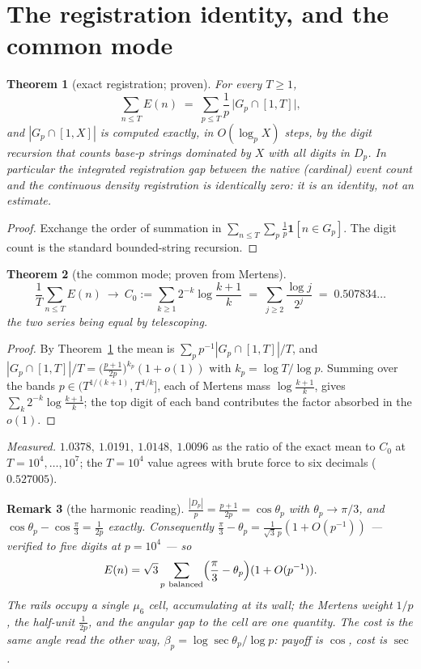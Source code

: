 \documentclass[11pt]{article}
\newtheorem{theorem}{Theorem}
\newtheorem{remark}[theorem]{Remark}
\begin{document}
\section{The registration identity, and the common mode}

\begin{theorem}[exact registration; proven]\label{thm:fubini}
For every $T\ge1$,
\[
  \sum_{n\le T}E(n)\;=\;\sum_{p\le T}\frac1p\,\bigl|G_p\cap[1,T]\bigr| ,
\]
and $|G_p\cap[1,X]|$ is computed exactly, in $O(\log_pX)$ steps, by the digit
recursion that counts base-$p$ strings dominated by $X$ with all digits in
$D_p$.  In particular the \emph{integrated} registration gap between the
native (cardinal) event count and the continuous density registration is
identically zero: it is an identity, not an estimate.
\end{theorem}

\begin{proof}
Exchange the order of summation in
$\sum_{n\le T}\sum_p\frac1p\mathbf 1[n\in G_p]$.  The digit count is the
standard bounded-string recursion.
\end{proof}

\begin{theorem}[the common mode; proven from Mertens]\label{thm:dc}
\[
  \frac1T\sum_{n\le T}E(n)\ \longrightarrow\ C_0
  :=\sum_{k\ge1}2^{-k}\log\frac{k+1}{k}
  \;=\;\sum_{j\ge2}\frac{\log j}{2^{j}}
  \;=\;0.507834\ldots
\]
the two series being equal by telescoping.
\end{theorem}

\begin{proof}
By Theorem~\ref{thm:fubini} the mean is $\sum_p p^{-1}|G_p\cap[1,T]|/T$, and
$|G_p\cap[1,T]|/T=\bigl(\frac{p+1}{2p}\bigr)^{k_p}(1+o(1))$ with
$k_p=\log T/\log p$.  Summing over the bands $p\in(T^{1/(k+1)},T^{1/k}]$, each
of Mertens mass $\log\frac{k+1}{k}$, gives $\sum_k2^{-k}\log\frac{k+1}{k}$;
the top digit of each band contributes the factor absorbed in the $o(1)$.
\end{proof}

\emph{Measured.}  $1.0378,\ 1.0191,\ 1.0148,\ 1.0096$ as the ratio of the exact
mean to $C_0$ at $T=10^4,\dots,10^7$; the $T=10^4$ value agrees with brute
force to six decimals ($0.527005$).

\begin{remark}[the harmonic reading]
$\frac{|D_p|}{p}=\frac{p+1}{2p}=\cos\theta_p$ with $\theta_p\to\pi/3$, and
$\cos\theta_p-\cos\frac\pi3=\frac1{2p}$ exactly.  Consequently
$\frac\pi3-\theta_p=\frac{1}{\sqrt3\,p}(1+O(p^{-1}))$ --- verified to five
digits at $p=10^4$ --- so
\[
  E(n)=\sqrt3\sum_{p\ \mathrm{balanced}}\Bigl(\frac\pi3-\theta_p\Bigr)(1+O(p^{-1})).
\]
The rails occupy a single $\mu_6$ cell, accumulating at its wall; the Mertens
weight $1/p$, the half-unit $\frac1{2p}$, and the angular gap to the cell are
one quantity.  The cost is the same angle read the other way,
$\beta_p=\log\sec\theta_p/\log p$: \emph{payoff is $\cos$, cost is $\sec$.}
\end{remark}
\end{document}
